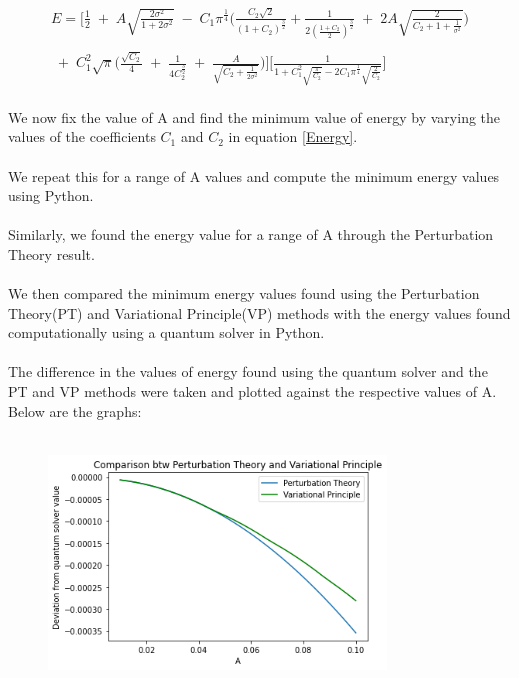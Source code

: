 \documentclass[12pt]{article}
\begin{document}
\newpage

\begin{equation}
\begin{split}
   E = \Big[ \frac{1}{2} \;+\; A \sqrt{\frac{2\sigma^2}{1 + 2\sigma^2}} \;-\; C_1 \pi^\frac{1}{4} \big( 
   \frac{C_2 \sqrt{2}}{(1 + C_2)^\frac{3}{2}} + \frac{1}{2 (\frac{1 + C_2}{2})^\frac{3}{2}} \;+\; 2A \sqrt{\frac{2}{C_2 + 1 + \frac{1}{\sigma^2}}} \big) 
   \\
    \\
    \;+\; C_1^2 \sqrt{\pi} \big(\frac{\sqrt{C_2}}{4} \;+\; \frac{1}{4 C_2^\frac{3}{2}} \;+\; \frac{A}{\sqrt{C_2 + 
    \frac{1}{2 \sigma^2}}}\big) \Big]  \Big[ \frac{1}{1 + C_1^2 \sqrt{\frac{\pi}{C_2}} - 2C_1 \pi^\frac{1}{4} \sqrt{\frac{2}{C_2}}} \Big]
\end{split}
\label{Energy}
\end{equation}
\\
We now fix the value of A and find the minimum value of energy by varying the values of the coefficients $C_1$ and $C_2$ in equation \ref{Energy}. 
\\
\\
We repeat this for a range of A values and compute the minimum energy values using Python.
\\
\\
Similarly, we found the energy value for a range of A through the Perturbation Theory result.
\\
\\
We then compared the minimum energy values found using the Perturbation Theory(PT) and Variational Principle(VP) 
methods with the energy values found computationally using a quantum solver in Python. 
\\
\\
The difference in the values of energy found using the quantum solver and the PT and VP methods were taken and 
plotted against the respective values of A. Below are the graphs: 
\\
\\
\begin{figure}[h]
    \centering
    \includegraphics[width=0.8\textwidth]{Comparison btw VP and PT-1.png}
\end{figure}
\end{document}
